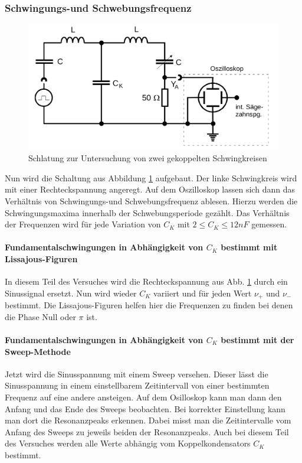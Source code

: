 \subsubsection{Schwingungs-und Schwebungsfrequenz}
\begin{figure}
  \centering
  \includegraphics[heigth = 6cm]{./logos/Abb6.png}
  \caption{Schlatung zur Untersuchung von zwei gekoppelten Schwingkreisen\cite{sample}}
  \label{fig:Abb6}
\end{figure}
\FloatBarrier
Nun wird die Schaltung aus Abbildung \ref{fig:Abb6} aufgebaut. Der linke Schwingkreis wird mit einer Rechteckspannung angeregt.
Auf dem Oszilloskop lassen sich dann das Verhältnis von Schwingungs-und Schwebungsfrequenz ablesen. Hierzu werden die Schwingungsmaxima innerhalb der Schwebungsperiode gezählt.
Das Verhältnis der Frequenzen wird für jede Variation von $C_K$ mit $ 2 \leq C_K \leq 12 nF $ gemessen.
\paragraph{Fundamentalschwingungen in Abhängigkeit von $C_K$  bestimmt mit Lissajous-Figuren}
  In diesem Teil des Versuches wird die Rechteckspannung aus Abb. \ref{fig:Abb6} durch ein Sinussignal ersetzt. Nun wird wieder $C_K$ variiert und für
  jeden Wert $ \nu_+$ und $\nu_-$ bestimmt. Die Lissajous-Figuren helfen hier die Frequenzen zu finden bei denen die Phase Null oder $ \pi $ ist.
\paragraph{Fundamentalschwingungen in Abhängigkeit von $C_K$  bestimmt mit der Sweep-Methode}
  Jetzt wird die Sinusspannung mit einem Sweep versehen. Dieser lässt die Sinusspannung in einem einstellbarem Zeitintervall von einer bestimmten Frequenz auf eine andere ansteigen.
  Auf dem Osilloskop kann man dann den Anfang und das Ende des Sweeps beobachten. Bei korrekter Einstellung kann man dort die Resonanzpeaks erkennen. Dabei misst man
  die Zeitintervalle vom Anfang des Sweeps zu jeweils beiden der Resonanzpeaks. Auch bei diesem Teil des Versuches werden alle Werte abhängig vom Koppelkondensators $ C_K$ bestimmt.

